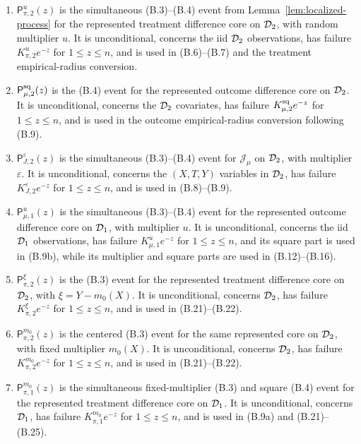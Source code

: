 \begin{enumerate}
\item \(\mathsf P_{\pi,2}^{u}(z)\) is the simultaneous (B.3)--(B.4)
event from Lemma~\ref{lem:localized-process} for the represented treatment
difference core on \(\mathcal D_2\), with random multiplier \(u\).  It is
unconditional, concerns the iid \(\mathcal D_2\) observations, has failure
\(K_{\pi,2}^{u}e^{-z}\) for \(1\le z\le n\), and is used in
(B.6)--(B.7) and the treatment empirical-radius conversion.

\item \(\mathsf P_{\mu,2}^{\rm sq}(z)\) is the (B.4) event for the
represented outcome difference core on \(\mathcal D_2\).  It is unconditional,
concerns the \(\mathcal D_2\) covariates, has failure
\(K_{\mu,2}^{\rm sq}e^{-z}\) for \(1\le z\le n\), and is used in the
outcome empirical-radius conversion following (B.9).

\item \(\mathsf P_{J,2}^{\varepsilon}(z)\) is the simultaneous
(B.3)--(B.4) event for \(\mathcal J_\mu\) on \(\mathcal D_2\), with multiplier
\(\varepsilon\).  It is unconditional, concerns the \((X,T,Y)\) variables
in \(\mathcal D_2\), has failure \(K_{J,2}^{\varepsilon}e^{-z}\) for
\(1\le z\le n\), and is used in (B.8)--(B.9).

\item \(\mathsf P_{\mu,1}^{u}(z)\) is the simultaneous (B.3)--(B.4)
event for the represented outcome difference core on \(\mathcal D_1\), with
multiplier \(u\).  It is unconditional, concerns the iid \(\mathcal D_1\)
observations, has failure \(K_{\mu,1}^{u}e^{-z}\) for
\(1\le z\le n\), and its square part is used in (B.9b), while its
multiplier and square parts are used in (B.12)--(B.16).

\item \(\mathsf P_{\pi,2}^{\xi}(z)\) is the (B.3) event for the
represented treatment difference core on \(\mathcal D_2\), with
\(\xi=Y-m_0(X)\).  It is unconditional, concerns \(\mathcal D_2\), has failure
\(K_{\pi,2}^{\xi}e^{-z}\) for \(1\le z\le n\), and is used in
(B.21)--(B.22).

\item \(\mathsf P_{\pi,2}^{m_0}(z)\) is the centered (B.3) event for
the same represented core on \(\mathcal D_2\), with fixed multiplier \(m_0(X)\).
It is unconditional, concerns \(\mathcal D_2\), has failure
\(K_{\pi,2}^{m_0}e^{-z}\) for \(1\le z\le n\), and is used in
(B.21)--(B.22).

\item \(\mathsf P_{\pi,1}^{m_0}(z)\) is the simultaneous fixed-multiplier
(B.3) and square (B.4) event for the represented treatment difference core
on \(\mathcal D_1\).  It is unconditional, concerns \(\mathcal D_1\), has failure
\(K_{\pi,1}^{m_0}e^{-z}\) for \(1\le z\le n\), and is used in
 (B.9a) and (B.21)--(B.25).


\end{enumerate}

